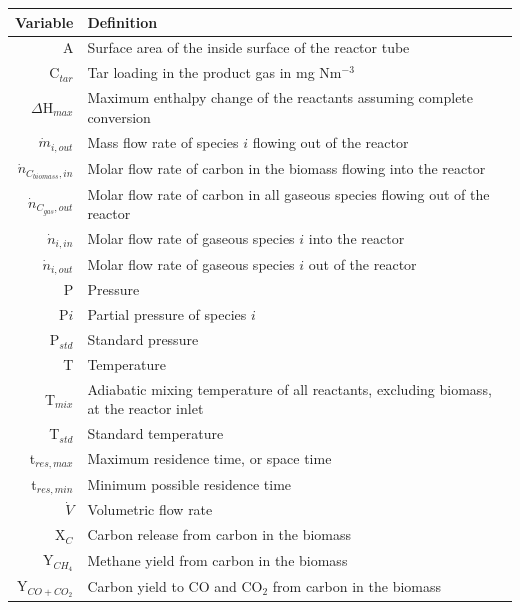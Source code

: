 \documentclass[11pt,twocolumn]{article}
\begin{document}
\begin{minipage}{\textwidth}
\centering
{}
\begin{tabular}{r l}
\toprule
Variable					&	Definition	\\
\midrule
A						&	Surface area of the inside surface of the reactor tube		\\
C$_{tar}	$				&	Tar loading in the product gas in mg Nm$^{-3}$	\\
$\Delta$H$_{max}$			&	Maximum enthalpy change of the reactants assuming complete conversion	\\
$\dot{m}_{i,out}$			&	Mass flow rate of species $i$ flowing out of the reactor	\\
$\dot{n}_{C_{biomass},in}$	&	Molar flow rate of carbon in the biomass flowing into the reactor	\\
$\dot{n}_{C_{gas},out}$		&	Molar flow rate of carbon in all gaseous species flowing out of the reactor	\\
$\dot{n}_{i,in}	$			&	Molar flow rate of gaseous species $i$ into the reactor	\\
$\dot{n}_{i,out}$			&	Molar flow rate of gaseous species $i$ out of the reactor	\\
P						&	Pressure	\\
P${i}$					&	Partial pressure of species $i$	\\
P$_{std}$					&	Standard pressure	\\
T						&	Temperature	\\
T$_{mix}$				&	Adiabatic mixing temperature of all reactants, excluding biomass, at the reactor inlet \\
T$_{std}$					&	Standard temperature	\\
t$_{res,max}$				& 	Maximum residence time, or space time	\\
t$_{res,min}$				&	Minimum possible residence time	\\
$\dot{V}$					&	Volumetric flow rate	\\
X$_{C}$					&	Carbon release from carbon in the biomass	\\
Y$_{CH_4}$				&	Methane yield from carbon in the biomass \\
Y$_{CO+CO_2}	$			&	Carbon yield to CO and CO$_2$ from carbon in the biomass	\\
\bottomrule
\end{tabular}
\end{minipage}
\end{document}
